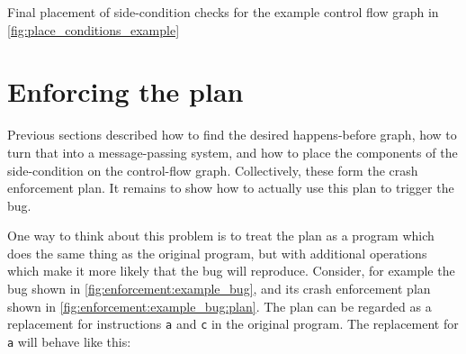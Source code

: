 \begin{sanefig}
  \caption{Final placement of side-condition checks for the example
    control flow graph in \autoref{fig:place_conditions_example}}
  \label{fig:place_conditions_example:result}
\end{sanefig}

\section{Enforcing the plan}
\label{sect:enforce:interpreting}

Previous sections described how to find the desired happens-before
graph, how to turn that into a message-passing system, and how to
place the components of the side-condition on the control-flow graph.
Collectively, these form the crash enforcement plan.  It remains to
show how to actually use this plan to trigger the bug.

One way to think about this problem is to treat the plan as a program
which does the same thing as the original program, but with additional
operations which make it more likely that the bug will reproduce.
Consider, for example the bug shown in
\autoref{fig:enforcement:example_bug}, and its crash enforcement
plan shown in \autoref{fig:enforcement:example_bug:plan}.  The plan
can be regarded as a replacement for instructions {\tt a} and {\tt c}
in the original program.  The replacement for {\tt a} will behave like
this:

